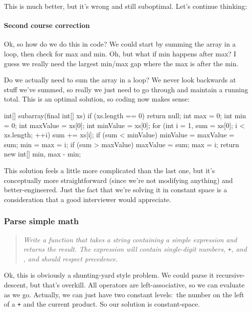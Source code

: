 \documentclass{article}
\begin{document}
        This is much better, but it's wrong and still suboptimal. Let's
        continue thinking:

\paragraph{Second course correction}
        Ok, so how do we do this in code? We could start by summing the array
        in a loop, then check for max and min. Oh, but what if min happens
        after max? I guess we really need the largest min/max gap where the max
        is after the min.

        Do we actually need to sum the array in a loop? We never look backwards
        at stuff we've summed, so really we just need to go through and
        maintain a running total. This is an optimal solution, so coding now
        makes sense:

\begin{javacode}
int[] subarray(final int[] xs) {
  if (xs.length == 0)
    return null;
  int max      = 0;
  int min      = 0;
  int maxValue = xs[0];
  int minValue = xs[0];
  for (int i = 1, sum = xs[0]; i < xs.length; ++i) {
    sum += xs[i];
    if (sum < minValue) {
      minValue = maxValue = sum;
      min      = max      = i;
    }
    if (sum > maxValue) {
      maxValue = sum;
      max      = i;
    }
  }
  return new int[] {min, max - min};
} \end{javacode}

        This solution feels a little more complicated than the last one, but
        it's conceptually more straightforward (since we're not modifying
        anything) and better-engineered. Just the fact that we're solving it in
        constant space is a consideration that a good interviewer would
        appreciate.

\subsubsection{Parse simple math}
\begin{quote}
\em
Write a function that takes a string containing a simple expression and
returns the result. The expression will contain single-digit numbers,
{\tt +}, and {\tt *}, and should respect precedence.
\end{quote}

      Ok, this is obviously a shunting-yard style problem. We could parse it
      recursive-descent, but that's overkill. All operators are
      left-associative, so we can evaluate as we go. Actually, we can just have
      two constant levels:~the number on the left of a {\tt +} and the current
      product. So our solution is constant-space.
\end{document}
